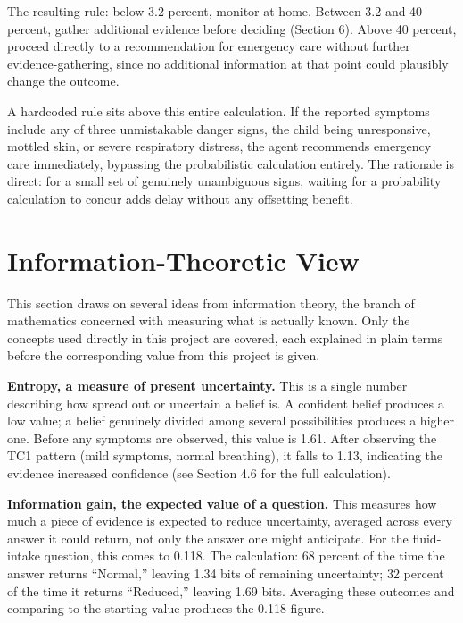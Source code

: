 \documentclass{article}
\begin{document}
The resulting rule: below 3.2 percent, monitor at home. Between 3.2 and
40 percent, gather additional evidence before deciding (Section 6).
Above 40 percent, proceed directly to a recommendation for emergency
care without further evidence-gathering, since no additional information
at that point could plausibly change the outcome.

A hardcoded rule sits above this entire calculation. If the reported
symptoms include any of three unmistakable danger signs, the child being
unresponsive, mottled skin, or severe respiratory distress, the agent
recommends emergency care immediately, bypassing the probabilistic
calculation entirely. The rationale is direct: for a small set of
genuinely unambiguous signs, waiting for a probability calculation to
concur adds delay without any offsetting benefit.

\hypertarget{information-theoretic-view}{%
\section{Information-Theoretic
View}\label{information-theoretic-view}}

This section draws on several ideas from information theory, the branch
of mathematics concerned with measuring what is actually known. Only the
concepts used directly in this project are covered, each explained in
plain terms before the corresponding value from this project is given.

\textbf{Entropy, a measure of present uncertainty.} This is a single
number describing how spread out or uncertain a belief is. A confident
belief produces a low value; a belief genuinely divided among several
possibilities produces a higher one. Before any symptoms are observed,
this value is 1.61. After observing the TC1 pattern (mild symptoms,
normal breathing), it falls to 1.13, indicating the evidence increased
confidence (see Section 4.6 for the full calculation).

\textbf{Information gain, the expected value of a question.} This
measures how much a piece of evidence is expected to reduce uncertainty,
averaged across every answer it could return, not only the answer one
might anticipate. For the fluid-intake question, this comes to 0.118.
The calculation: 68 percent of the time the answer returns ``Normal,''
leaving 1.34 bits of remaining uncertainty; 32 percent of the time it
returns ``Reduced,'' leaving 1.69 bits. Averaging these outcomes and
comparing to the starting value produces the 0.118 figure.
\end{document}
